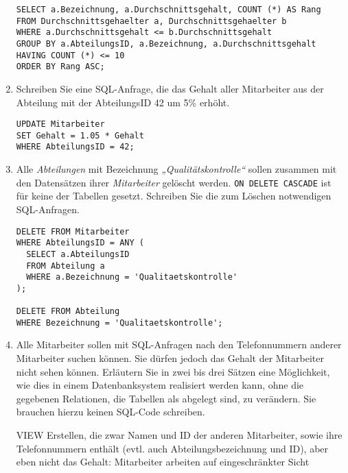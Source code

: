 \documentclass{lehramt-informatik-aufgabe}
\begin{document}
\begin{enumerate}
\begin{liAntwort}
\begin{verbatim}
SELECT a.Bezeichnung, a.Durchschnittsgehalt, COUNT (*) AS Rang
FROM Durchschnittsgehaelter a, Durchschnittsgehaelter b
WHERE a.Durchschnittsgehalt <= b.Durchschnittsgehalt
GROUP BY a.AbteilungsID, a.Bezeichnung, a.Durchschnittsgehalt
HAVING COUNT (*) <= 10
ORDER BY Rang ASC;
\end{verbatim}
\end{liAntwort}


\item Schreiben Sie eine SQL-Anfrage, die das Gehalt aller Mitarbeiter
aus der Abteilung mit der AbteilungsID 42 um 5\% erhöht.

\begin{liAntwort}
\begin{verbatim}
UPDATE Mitarbeiter
SET Gehalt = 1.05 * Gehalt
WHERE AbteilungsID = 42;
\end{verbatim}
\end{liAntwort}


\item Alle \emph{Abteilungen} mit Bezeichnung
\emph{„Qualitätskontrolle“} sollen zusammen mit den Datensätzen ihrer
\emph{Mitarbeiter} gelöscht
werden. \verb|ON DELETE CASCADE| ist für keine der Tabellen gesetzt.
Schreiben Sie die zum Löschen notwendigen SQL-Anfragen.

\begin{liAntwort}
\begin{verbatim}
DELETE FROM Mitarbeiter
WHERE AbteilungsID = ANY (
  SELECT a.AbteilungsID
  FROM Abteilung a
  WHERE a.Bezeichnung = 'Qualitaetskontrolle'
);

DELETE FROM Abteilung
WHERE Bezeichnung = 'Qualitaetskontrolle';
\end{verbatim}
\end{liAntwort}


\item Alle Mitarbeiter sollen mit SQL-Anfragen nach den Telefonnummern
anderer Mitarbeiter suchen können. Sie dürfen jedoch das Gehalt der
Mitarbeiter nicht sehen können. Erläutern Sie in zwei bis drei Sätzen
eine Möglichkeit, wie dies in einem Datenbanksystem realisiert werden
kann, ohne die gegebenen Relationen, die Tabellen als abgelegt sind, zu
verändern. Sie brauchen hierzu keinen SQL-Code schreiben.

\begin{liAntwort}
VIEW Erstellen, die zwar Namen und ID der anderen Mitarbeiter, sowie
ihre Telefonnummern enthält (evtl. auch Abteilungsbezeichnung und ID),
aber eben nicht das Gehalt: Mitarbeiter arbeiten auf eingeschränkter
Sicht


\end{liAntwort}
\end{enumerate}
\end{document}
